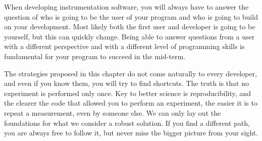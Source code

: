 When developing instrumentation software, you will always have to answer the question of who is going to be the user of your program and who is going to build on your development. Most likely both the first user and developer is going to be yourself, but this can quickly change. Being able to answer questions from a user with a different perspective and with a different level of programming skills is fundamental for your program to succeed in the mid-term.

The strategies proposed in this chapter do not come naturally to every developer, and even if you know them, you will try to find shortcuts. The truth is that no experiment is performed only once. Key to better science is reproducibility, and the clearer the code
that allowed you to perform an experiment, the easier it is to repeat a measurement, even by someone else. We can only lay out the foundations for what we consider a robust solution. If you find a different path, you are always free to follow it, but never miss the bigger picture from your sight. 

